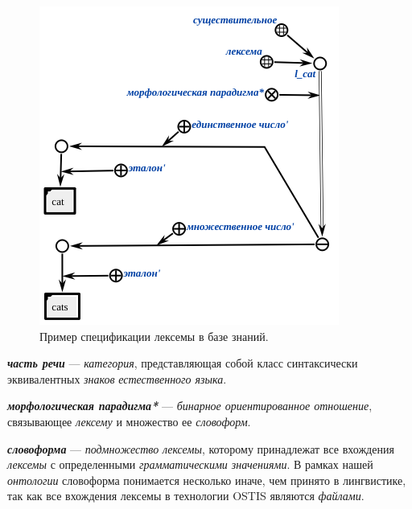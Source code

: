 \begin{figure}[h]
    \centering
    \includegraphics[scale=0.8]{images/part2/chapter_lang/lexeme_example}
    \caption{Пример спецификации лексемы в базе знаний.}
    \label{fig:lexeme_example}
\end{figure}

\textit{\textbf{часть речи}} --- \textit{категория}, представляющая собой класс синтаксически эквивалентных \textit{знаков} \textit{естественного языка}.

\begin{SCn}


\end{SCn}

\textit{\textbf{морфологическая парадигма*}} --- \textit{бинарное ориентированное отношение}, связывающее \textit{лексему} и множество ее \textit{словоформ}.

\textit{\textbf{словоформа}} --- \textit{подмножество} \textit{лексемы}, которому принадлежат все вхождения \textit{лексемы} с определенными \textit{грамматическими значениями}.
В рамках нашей \textit{онтологии} словоформа понимается несколько иначе, чем принято в лингвистике, так как все вхождения лексемы в технологии OSTIS являются \textit{файлами}.

